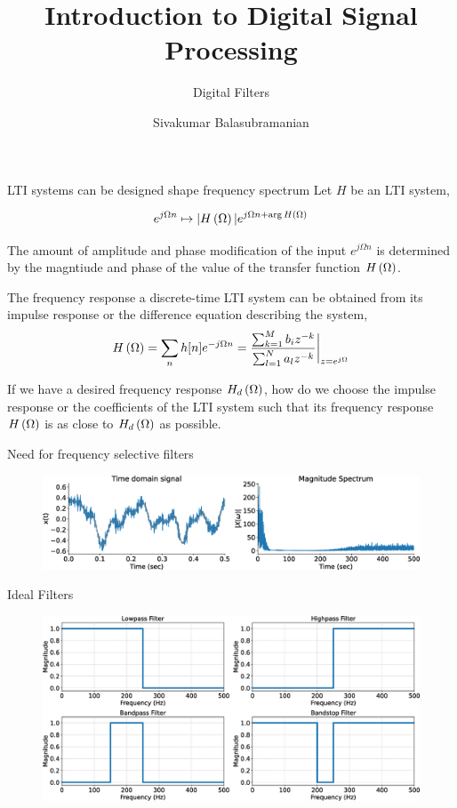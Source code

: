 \documentclass[aspectratio=169]{beamer}
\title{Introduction to Digital Signal Processing}
\subtitle{Digital Filters}
\author{Sivakumar Balasubramanian}
\institute[Christian Medical College] %
{
  \inst{}%
  Department of Bioengineering\\
  Christian Medical College, Bagayam\\
  Vellore 632002
}
\date{}
\def\lp{\ensuremath\left(}
\def\rp{\ensuremath\right)}
\begin{document}
\begin{frame}
  \titlepage
\end{frame}


\begin{frame}[t]{LTI systems can be designed shape frequency spectrum}
Let $H$ be an LTI system,

\[ e^{j\Omega n} \mapsto \vert H\lp \Omega \rp \vert e^{j\Omega n + \arg H\lp \Omega\rp} \]

The amount of amplitude and phase modification of the input $e^{j\Omega n}$ is determined by the magntiude and phase of the value of the transfer function $H\lp \Omega \rp$.
\vspace{0.5cm}

The frequency response a discrete-time LTI system can be obtained from its impulse response or the difference equation describing the system,
\[ H\lp \Omega \rp = \sum_{n} h[n] e^{-j\Omega n} = \frac{\sum_{k=1}^M b_i z^{-k}}{\sum_{l=1}^N a_l z^{-k}}\bigg\vert_{z = e^{j\Omega}} \]

If we have a desired frequency response $H_d\lp \Omega \rp$, how do we choose the impulse response or the coefficients of the LTI system such that its frequency response $H\lp \Omega \rp$ is as close to $H_d\lp \Omega \rp$ as possible. 
\end{frame}


\begin{frame}[t]{Need for frequency selective filters}
  \begin{figure}
  \centering
  \includegraphics[width=1\textwidth]{img/example1.eps}
  \end{figure}
\end{frame}


\begin{frame}[t]{Ideal Filters}
  \begin{figure}
  \centering
  \includegraphics[width=1\textwidth]{img/idealfilts.eps}
  \end{figure}
\end{frame}
\end{document}
